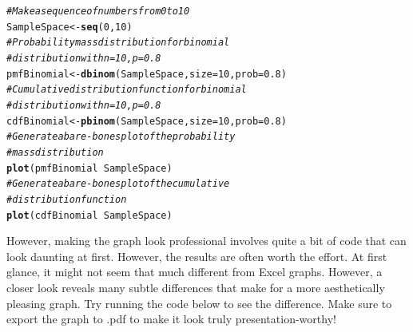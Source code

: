 \documentclass[nohyper,justified,marginals=raggedright]{tufte-book}\usepackage[]{graphicx}\usepackage[]{color}
\makeatletter
\newcommand{\hlnum}[1]{\textcolor[rgb]{0.686,0.059,0.569}{#1}}%
\newcommand{\hlcom}[1]{\textcolor[rgb]{0.678,0.584,0.686}{\textit{#1}}}%
\newcommand{\hlopt}[1]{\textcolor[rgb]{0,0,0}{#1}}%
\newcommand{\hlstd}[1]{\textcolor[rgb]{0.345,0.345,0.345}{#1}}%
\newcommand{\hlkwb}[1]{\textcolor[rgb]{0.69,0.353,0.396}{#1}}%
\newcommand{\hlkwc}[1]{\textcolor[rgb]{0.333,0.667,0.333}{#1}}%
\newcommand{\hlkwd}[1]{\textcolor[rgb]{0.737,0.353,0.396}{\textbf{#1}}}%
\newenvironment{kframe}{%
 \def\at@end@of@kframe{}%
 \ifinner\ifhmode%
  \def\at@end@of@kframe{\end{minipage}}%
  \begin{minipage}{\columnwidth}%
 \fi\fi%
 \def\FrameCommand##1{\hskip\@totalleftmargin \hskip-\fboxsep
 \colorbox{shadecolor}{##1}\hskip-\fboxsep
     \hskip-\linewidth \hskip-\@totalleftmargin \hskip\columnwidth}%
 \MakeFramed {\advance\hsize-\width
   \@totalleftmargin\z@ \linewidth\hsize
   \@setminipage}}%
 {\par\unskip\endMakeFramed%
 \at@end@of@kframe}
\newenvironment{knitrout}{}{} %
\makeatother
\begin{document}
\begin{knitrout}
\color{fgcolor}\begin{kframe}
\begin{alltt}
\hlcom{# Make a sequence of numbers from 0 to 10}
\hlstd{SampleSpace} \hlkwb{<-} \hlkwd{seq}\hlstd{(}\hlnum{0}\hlstd{,} \hlnum{10}\hlstd{)}
\hlcom{# Probability mass distribution for binomial}
\hlcom{# distribution with n = 10, p = 0.8}
\hlstd{pmfBinomial} \hlkwb{<-} \hlkwd{dbinom}\hlstd{(SampleSpace,} \hlkwc{size} \hlstd{=} \hlnum{10}\hlstd{,} \hlkwc{prob} \hlstd{=} \hlnum{0.8}\hlstd{)}
\hlcom{# Cumulative distribution function for binomial}
\hlcom{# distribution with n = 10, p = 0.8}
\hlstd{cdfBinomial} \hlkwb{<-} \hlkwd{pbinom}\hlstd{(SampleSpace,} \hlkwc{size} \hlstd{=} \hlnum{10}\hlstd{,} \hlkwc{prob} \hlstd{=} \hlnum{0.8}\hlstd{)}
\hlcom{# Generate a bare-bones plot of the probability}
\hlcom{# mass distribution}
\hlkwd{plot}\hlstd{(pmfBinomial} \hlopt{~} \hlstd{SampleSpace)}
\hlcom{# Generate a bare-bones plot of the cumulative}
\hlcom{# distribution function}
\hlkwd{plot}\hlstd{(cdfBinomial} \hlopt{~} \hlstd{SampleSpace)}
\end{alltt}
\end{kframe}
\end{knitrout}

However, making the graph look professional involves quite a bit of code that can look daunting at first. However, the results are often worth the effort. At first glance, it might not seem that much different from Excel graphs. However, a closer look reveals many subtle differences that make for a more aesthetically pleasing graph. Try running the code below to see the difference. Make sure to export the graph to .pdf to make it look truly presentation-worthy!
\end{document}
